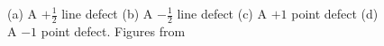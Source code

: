 \documentclass[preprint, aps]{revtex4-1}
\begin{document}
	\begin{figure}[!htbp] 

		\caption{(a) A $+\frac{1}{2}$ line defect (b) A $-\frac{1}{2}$ line
		defect (c) A $+1$ point defect (d) A $-1$ point defect. Figures from
		\cite{chuang91}}
		\label{fig:defects}
	\end{figure}
\end{document}
